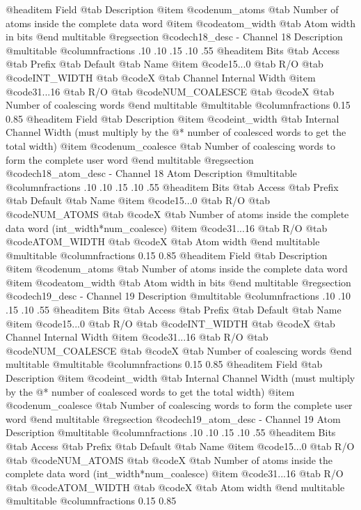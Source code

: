 @headitem Field @tab Description
@item @code{num_atoms} @tab Number of atoms inside the complete data word
@item @code{atom_width} @tab Atom width in bits
@end multitable
@regsection @code{ch18_desc} - Channel 18 Description
@multitable @columnfractions .10 .10 .15 .10 .55
@headitem Bits @tab Access @tab Prefix @tab Default @tab Name
@item @code{15...0}
@tab R/O @tab
@code{INT_WIDTH}
@tab @code{X} @tab 
Channel Internal Width
@item @code{31...16}
@tab R/O @tab
@code{NUM_COALESCE}
@tab @code{X} @tab 
Number of coalescing words
@end multitable
@multitable @columnfractions 0.15 0.85
@headitem Field @tab Description
@item @code{int_width} @tab Internal Channel Width (must multiply by the @* number of coalesced words to get the total width)
@item @code{num_coalesce} @tab Number of coalescing words to form the complete user word
@end multitable
@regsection @code{ch18_atom_desc} - Channel 18 Atom Description
@multitable @columnfractions .10 .10 .15 .10 .55
@headitem Bits @tab Access @tab Prefix @tab Default @tab Name
@item @code{15...0}
@tab R/O @tab
@code{NUM_ATOMS}
@tab @code{X} @tab 
Number of atoms inside the complete data word (int_width*num_coalesce)
@item @code{31...16}
@tab R/O @tab
@code{ATOM_WIDTH}
@tab @code{X} @tab 
Atom width
@end multitable
@multitable @columnfractions 0.15 0.85
@headitem Field @tab Description
@item @code{num_atoms} @tab Number of atoms inside the complete data word
@item @code{atom_width} @tab Atom width in bits
@end multitable
@regsection @code{ch19_desc} - Channel 19 Description
@multitable @columnfractions .10 .10 .15 .10 .55
@headitem Bits @tab Access @tab Prefix @tab Default @tab Name
@item @code{15...0}
@tab R/O @tab
@code{INT_WIDTH}
@tab @code{X} @tab 
Channel Internal Width
@item @code{31...16}
@tab R/O @tab
@code{NUM_COALESCE}
@tab @code{X} @tab 
Number of coalescing words
@end multitable
@multitable @columnfractions 0.15 0.85
@headitem Field @tab Description
@item @code{int_width} @tab Internal Channel Width (must multiply by the @* number of coalesced words to get the total width)
@item @code{num_coalesce} @tab Number of coalescing words to form the complete user word
@end multitable
@regsection @code{ch19_atom_desc} - Channel 19 Atom Description
@multitable @columnfractions .10 .10 .15 .10 .55
@headitem Bits @tab Access @tab Prefix @tab Default @tab Name
@item @code{15...0}
@tab R/O @tab
@code{NUM_ATOMS}
@tab @code{X} @tab 
Number of atoms inside the complete data word (int_width*num_coalesce)
@item @code{31...16}
@tab R/O @tab
@code{ATOM_WIDTH}
@tab @code{X} @tab 
Atom width
@end multitable
@multitable @columnfractions 0.15 0.85
